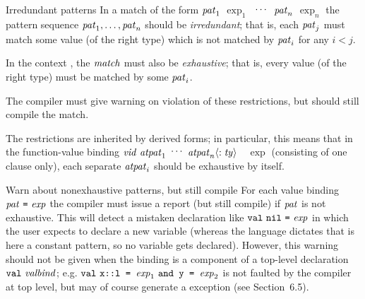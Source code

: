 \begin{clause}{Irredundant patterns}
In a match of the form $\textit{pat\/}_{1}$ \ml{=>} $\exp_{1}$ \ml{|}$\;\mathinner{{}^{\textstyle .\,.\,.}}\;$
\ml{|} $\textit{pat\/}_{n}$ \ml{=>} $\exp_{n}$ 
the pattern sequence $\textit{pat\/}_{1},\ldots,\textit{pat\/}_{n}$ should be \emph{irredundant};
that is, each $\textit{pat\/}_{j}$ must match some value
(of the right type) which is not matched by $\textit{pat\/}_{i}$ for any $i<j$.

In the context {\fnexp}, the $\textit{match\/}$ must also be \emph{exhaustive}; that is,
every value (of the right type) must be matched by some $\textit{pat\/}_i$.

The compiler must give warning on violation of these restrictions, 
but should still compile the match. 

The restrictions are inherited by derived forms; in particular,
this means that in the function-value binding
$\textit{vid\/}\ \textit{atpat\/}_{1}\ \mathinner{{}^{\textstyle .\,.\,.}}\ \textit{atpat\/}_{n}\langle : \textit{ty\/}\rangle$\ \ml{=}\ $\exp$
(consisting of one clause only), each separate $\textit{atpat\/}_{i}$ should be
exhaustive by itself.
\end{clause}

\begin{clause}{Warn about nonexhaustive patterns, but still compile}
For each value binding $\pat\ \mbox{\ml{=}}\ \exp$ the compiler must
issue a report (but still compile) if $\textit{pat\/}$ is not exhaustive.  This
will detect a mistaken declaration like
$\VAL\ \ml{nil}\ \mbox{\ml{=}}\ \exp$ in which the user expects to
declare a new variable  (whereas the language dictates that
 is here a constant pattern, so no variable gets declared).
However, this warning should not be given when the binding is a
component of a top-level declaration $\mbox{{\tt val}\ \textit{valbind\/}}$; e.g.
$\VAL\ \mbox{\ml{x::l = }}\exp_{1}\ \mbox{\ml{\AND\ y = }}\exp_{2}$ is not
faulted by the compiler at top level, but may of course generate a
 exception (see Section~6.5).
\end{clause}